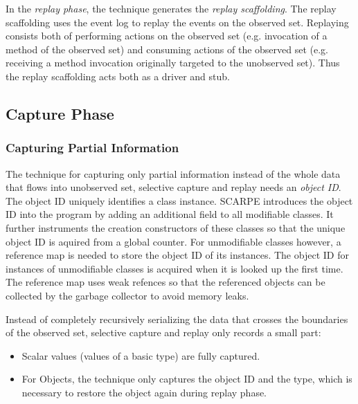 In the \emph{replay phase}, the technique generates the \emph{replay scaffolding}. The replay scaffolding uses the event log to replay the events on the observed set. Replaying consists both of performing actions on the observed set (e.g. invocation of a method of the observed set) and consuming actions of the observed set (e.g. receiving a method invocation originally targeted to the unobserved set). Thus the replay scaffolding acts both as a driver and stub.

\subsection{Capture Phase}
\subsubsection{Capturing Partial Information}
The technique for capturing only partial information instead of the whole data that flows into unobserved set, selective capture and replay needs an \emph{object ID}. The object ID uniquely identifies a class instance. SCARPE introduces the object ID into the program by adding an additional field to all modifiable classes. It further instruments the creation constructors of these classes so that the unique object ID is aquired from a global counter. For unmodifiable classes however, a reference map is needed to store the object ID of its instances. The object ID for instances of unmodifiable classes is acquired when it is looked up the first time. The reference map uses weak refences so that the referenced objects can be collected by the garbage collector to avoid memory leaks.

Instead of completely recursively serializing the data that crosses the boundaries of the observed set, selective capture and replay only records a small part:
\begin{itemize}
 \item Scalar values (values of a basic type) are fully captured.
 \item For Objects, the technique only captures the object ID and the type, which is necessary to restore the object again during replay phase.
\end{itemize}

